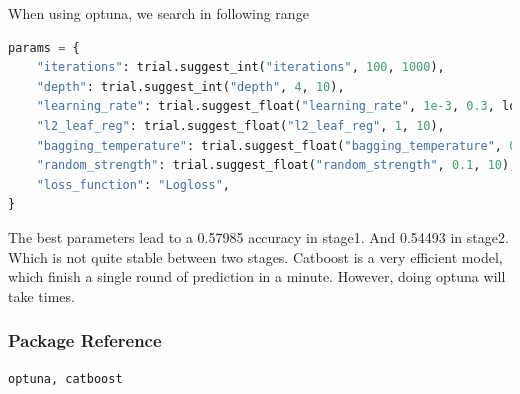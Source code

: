 \par When using optuna, we search in following range
\begin{lstlisting}[language=Python]
params = {
    "iterations": trial.suggest_int("iterations", 100, 1000),
    "depth": trial.suggest_int("depth", 4, 10),
    "learning_rate": trial.suggest_float("learning_rate", 1e-3, 0.3, log=True),
    "l2_leaf_reg": trial.suggest_float("l2_leaf_reg", 1, 10),
    "bagging_temperature": trial.suggest_float("bagging_temperature", 0, 1),
    "random_strength": trial.suggest_float("random_strength", 0.1, 10),
    "loss_function": "Logloss",
}
\end{lstlisting}
The best parameters lead to a 0.57985 accuracy in stage1. And 0.54493 in stage2. Which is not quite stable between two stages. Catboost is a very efficient model, which finish a single round of prediction in a minute. However, doing optuna will take times.  
\subsubsection*{Package Reference}
\begin{lstlisting}
optuna, catboost
\end{lstlisting}